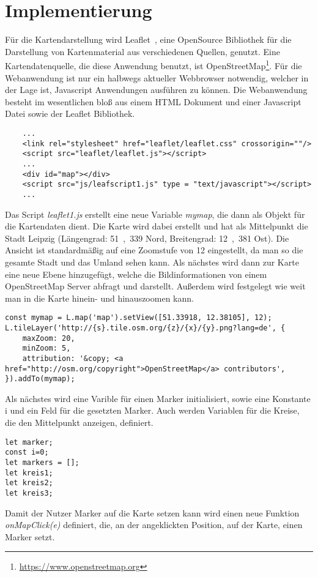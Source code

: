 \documentclass[a4paper, twoside, 12pt]{scrreprt}
\begin{document}
\chapter{Implementierung}
Für die Kartendarstellung wird Leaflet~\citep{crickard2014leaflet}, eine OpenSource Bibliothek für die Darstellung von Kartenmaterial aus verschiedenen Quellen, genutzt. Eine Kartendatenquelle, die diese Anwendung benutzt, ist OpenStreetMap\footnote{\url{https://www.openstreetmap.org}}.
Für die Webanwendung ist nur ein halbwegs aktueller Webbrowser notwendig, welcher in der Lage ist, Javascript Anwendungen ausführen zu können.
Die Webanwendung besteht im wesentlichen bloß aus einem HTML Dokument und einer Javascript Datei sowie der Leaflet Bibliothek.
\begin{lstlisting}
	...
	<link rel="stylesheet" href="leaflet/leaflet.css" crossorigin=""/>
	<script src="leaflet/leaflet.js"></script>
	...
	<div id="map"></div>
	<script src="js/leafscript1.js" type = "text/javascript"></script>
	...
\end{lstlisting}
Das Script \textit{leaflet1.js} erstellt eine neue Variable \textit{mymap}, die dann als Objekt für die Kartendaten dient.
Die Karte wird dabei erstellt und hat als Mittelpunkt die Stadt Leipzig (Längengrad: \si{51{,}339}{\textdegree}  Nord, Breitengrad: \si{12{,}381}{\textdegree}  Ost). Die Ansicht ist standardmäßig auf eine Zoomstufe von 12 eingestellt, da man so die gesamte Stadt und das Umland sehen kann.
Als nächstes wird dann zur Karte eine neue Ebene hinzugefügt, welche die Bildinformationen von einem OpenStreetMap Server abfragt und darstellt.
Außerdem wird festgelegt wie weit man in die Karte hinein- und hinauszoomen kann.
\lstset{language=Java}
\begin{lstlisting}
const mymap = L.map('map').setView([51.33918, 12.38105], 12);
L.tileLayer('http://{s}.tile.osm.org/{z}/{x}/{y}.png?lang=de', {
	maxZoom: 20,
	minZoom: 5,
	attribution: '&copy; <a href="http://osm.org/copyright">OpenStreetMap</a> contributors',
}).addTo(mymap);
\end{lstlisting}
Als nächstes wird eine Varible für einen Marker initialisiert, sowie eine Konstante i und ein Feld für die gesetzten Marker. Auch werden Variablen für die Kreise, die den Mittelpunkt anzeigen, definiert.
\begin{lstlisting}
let marker;
const i=0;
let markers = [];
let kreis1;
let kreis2;
let kreis3;
\end{lstlisting}
Damit der Nutzer Marker auf die Karte setzen kann wird einen neue Funktion \textit{onMapClick(e)} definiert, die, an der angeklickten Position, auf der Karte, einen Marker setzt.
\end{document}
